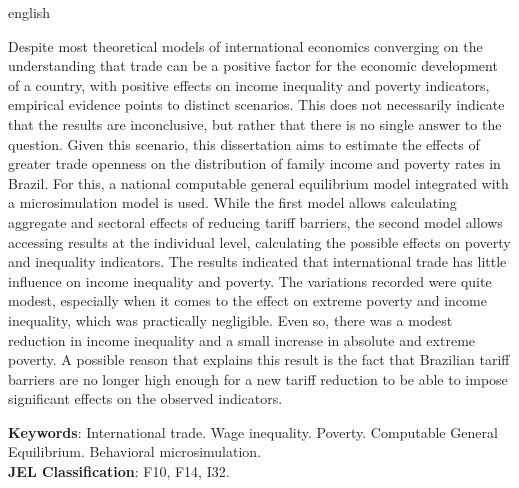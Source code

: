 

\begin{resumo}[Abstract]
	\begin{otherlanguage*}{english}
		\SingleSpacing
		
		Despite most theoretical models of international economics converging on the understanding that trade can be a positive factor for the economic development of a country, with positive effects on income inequality and poverty indicators, empirical evidence points to distinct scenarios. This does not necessarily indicate that the results are inconclusive, but rather that there is no single answer to the question. Given this scenario, this dissertation aims to estimate the effects of greater trade openness on the distribution of family income and poverty rates in Brazil. For this, a national computable general equilibrium model integrated with a microsimulation model is used. While the first model allows calculating aggregate and sectoral effects of reducing tariff barriers, the second model allows accessing results at the individual level, calculating the possible effects on poverty and inequality indicators. The results indicated that international trade has little influence on income inequality and poverty. The variations recorded were quite modest, especially when it comes to the effect on extreme poverty and income inequality, which was practically negligible. Even so, there was a modest reduction in income inequality and a small increase in absolute and extreme poverty. A possible reason that explains this result is the fact that Brazilian tariff barriers are no longer high enough for a new tariff reduction to be able to impose significant effects on the observed indicators.
		
		\noindent 
		\textbf{Keywords}: International trade. Wage inequality. Poverty. Computable General Equilibrium. Behavioral microsimulation. \\
		\textbf{JEL Classification}: F10, F14, I32.
	\end{otherlanguage*}
\end{resumo}


